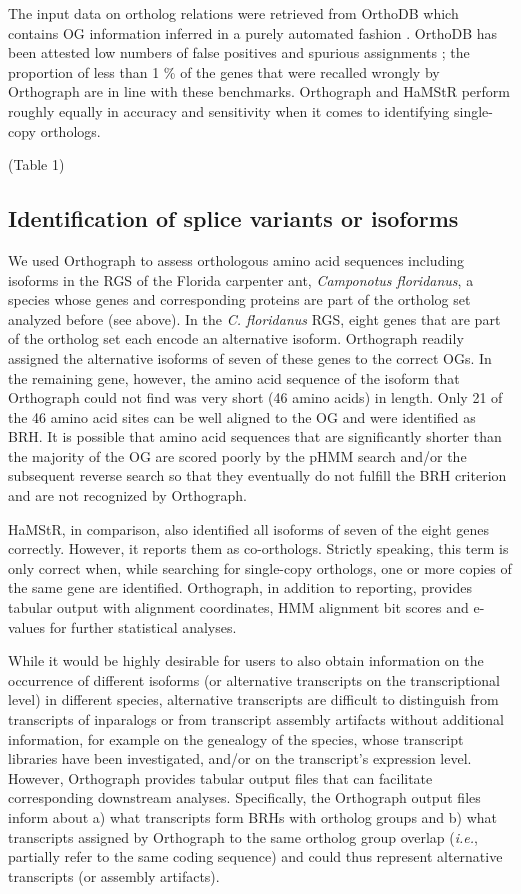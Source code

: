 The input data on ortholog relations were retrieved from OrthoDB which
contains OG information inferred in a purely automated fashion
\cite{Waterhouse2011}. OrthoDB has been attested low numbers of false
positives and spurious assignments \cite{Trachana2011}; the proportion
of less than 1 \% of the genes that were recalled wrongly by Orthograph
are in line with these benchmarks. Orthograph and HaMStR perform roughly
equally in accuracy and sensitivity when it comes to identifying
single-copy orthologs.

(Table 1)

\subsection{Identification of splice variants or
isoforms}\label{identification-of-splice-variants-or-isoforms}

We used Orthograph to assess orthologous amino acid sequences including
isoforms in the RGS of the Florida carpenter ant, \emph{Camponotus
floridanus}, a species whose genes and corresponding proteins are part
of the ortholog set analyzed before (see above). In the \emph{C.
floridanus} RGS, eight genes that are part of the ortholog set each
encode an alternative isoform. Orthograph readily assigned the
alternative isoforms of seven of these genes to the correct OGs. In the
remaining gene, however, the amino acid sequence of the isoform that
Orthograph could not find was very short (46 amino acids) in length.
Only 21 of the 46 amino acid sites can be well aligned to the OG and
were identified as BRH. It is possible that amino acid sequences that
are significantly shorter than the majority of the OG are scored poorly
by the pHMM search and/or the subsequent reverse search so that they
eventually do not fulfill the BRH criterion and are not recognized by
Orthograph.

HaMStR, in comparison, also identified all isoforms of seven of the
eight genes correctly. However, it reports them as co-orthologs.
Strictly speaking, this term is only correct when, while searching for
single-copy orthologs, one or more copies of the same gene are
identified. Orthograph, in addition to reporting, provides tabular
output with alignment coordinates, HMM alignment bit scores and e-values
for further statistical analyses.

While it would be highly desirable for users to also obtain information
on the occurrence of different isoforms (or alternative transcripts on
the transcriptional level) in different species, alternative transcripts
are difficult to distinguish from transcripts of inparalogs or from
transcript assembly artifacts without additional information, for
example on the genealogy of the species, whose transcript libraries have
been investigated, and/or on the transcript's expression level. However,
Orthograph provides tabular output files that can facilitate
corresponding downstream analyses. Specifically, the Orthograph output
files inform about a) what transcripts form BRHs with ortholog groups
and b) what transcripts assigned by Orthograph to the same ortholog
group overlap (\emph{i.e.}, partially refer to the same coding sequence)
and could thus represent alternative transcripts (or assembly
artifacts).

